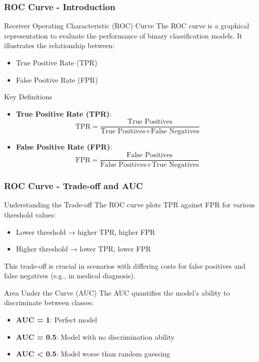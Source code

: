 \documentclass[aspectratio=169]{beamer}
\begin{document}
\begin{frame}[fragile]
    \frametitle{ROC Curve - Introduction}
    \begin{block}{Receiver Operating Characteristic (ROC) Curve}
        The ROC curve is a graphical representation to evaluate the performance of binary classification models.
        It illustrates the relationship between:
        \begin{itemize}
            \item True Positive Rate (TPR)
            \item False Positive Rate (FPR)
        \end{itemize}
    \end{block}
    
    \begin{block}{Key Definitions}
        \begin{itemize}
            \item \textbf{True Positive Rate (TPR)}:
            \[
            \text{TPR} = \frac{\text{True Positives}}{\text{True Positives} + \text{False Negatives}}
            \]
            \item \textbf{False Positive Rate (FPR)}:
            \[
            \text{FPR} = \frac{\text{False Positives}}{\text{False Positives} + \text{True Negatives}}
            \]
        \end{itemize}
    \end{block}
\end{frame}

\begin{frame}[fragile]
    \frametitle{ROC Curve - Trade-off and AUC}
    \begin{block}{Understanding the Trade-off}
        The ROC curve plots TPR against FPR for various threshold values:
        \begin{itemize}
            \item Lower threshold → higher TPR, higher FPR
            \item Higher threshold → lower TPR, lower FPR
        \end{itemize}
        This trade-off is crucial in scenarios with differing costs for false positives and false negatives (e.g., in medical diagnosis).
    \end{block}
    
    \begin{block}{Area Under the Curve (AUC)}
        The AUC quantifies the model’s ability to discriminate between classes:
        \begin{itemize}
            \item \textbf{AUC = 1}: Perfect model
            \item \textbf{AUC = 0.5}: Model with no discrimination ability
            \item \textbf{AUC < 0.5}: Model worse than random guessing
        \end{itemize}
    \end{block}
\end{frame}
\end{document}
